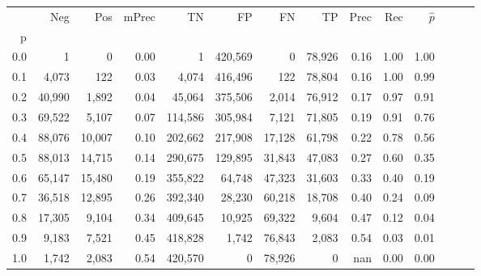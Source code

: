 \begin{tabular}{rrrrrrrrrrrrrr}
\toprule
{} &     Neg &     Pos & mPrec &       TN &       FP &      FN &      TP &  Prec &   Rec & $\hat{p}$ \\
p   &         &         &       &          &          &         &         &       &       &           \\
\midrule
0.0 &       1 &       0 &  0.00 &        1 &  420,569 &       0 &  78,926 &  0.16 &  1.00 &      1.00 \\
0.1 &   4,073 &     122 &  0.03 &    4,074 &  416,496 &     122 &  78,804 &  0.16 &  1.00 &      0.99 \\
0.2 &  40,990 &   1,892 &  0.04 &   45,064 &  375,506 &   2,014 &  76,912 &  0.17 &  0.97 &      0.91 \\
0.3 &  69,522 &   5,107 &  0.07 &  114,586 &  305,984 &   7,121 &  71,805 &  0.19 &  0.91 &      0.76 \\
0.4 &  88,076 &  10,007 &  0.10 &  202,662 &  217,908 &  17,128 &  61,798 &  0.22 &  0.78 &      0.56 \\
0.5 &  88,013 &  14,715 &  0.14 &  290,675 &  129,895 &  31,843 &  47,083 &  0.27 &  0.60 &      0.35 \\
0.6 &  65,147 &  15,480 &  0.19 &  355,822 &   64,748 &  47,323 &  31,603 &  0.33 &  0.40 &      0.19 \\
0.7 &  36,518 &  12,895 &  0.26 &  392,340 &   28,230 &  60,218 &  18,708 &  0.40 &  0.24 &      0.09 \\
0.8 &  17,305 &   9,104 &  0.34 &  409,645 &   10,925 &  69,322 &   9,604 &  0.47 &  0.12 &      0.04 \\
0.9 &   9,183 &   7,521 &  0.45 &  418,828 &    1,742 &  76,843 &   2,083 &  0.54 &  0.03 &      0.01 \\
1.0 &   1,742 &   2,083 &  0.54 &  420,570 &        0 &  78,926 &       0 &   nan &  0.00 &      0.00 \\
\bottomrule
\end{tabular}
